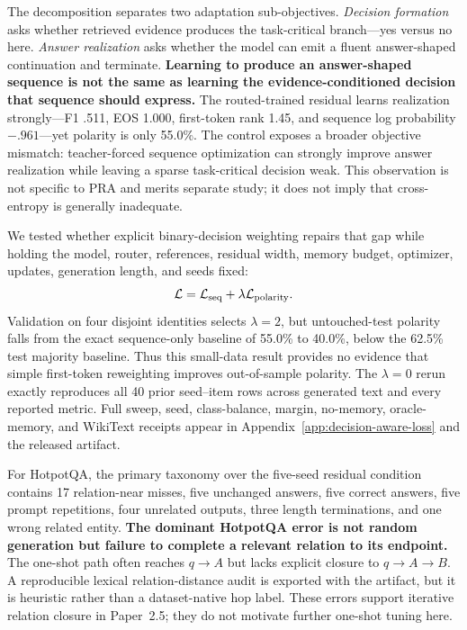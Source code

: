 \documentclass[11pt]{article}
\begin{document}
The decomposition separates two adaptation sub-objectives. \emph{Decision formation} asks whether
retrieved evidence produces the task-critical branch---yes versus no here. \emph{Answer
realization} asks whether the model can emit a fluent answer-shaped continuation and terminate.
\textbf{Learning to produce an answer-shaped sequence is not the same as learning the
evidence-conditioned decision that sequence should express.} The routed-trained residual learns
realization strongly---F1 .511, EOS 1.000, first-token rank 1.45, and sequence log probability
$-.961$---yet polarity is only 55.0\%. The control exposes a broader objective mismatch:
teacher-forced sequence optimization can strongly improve answer realization while leaving a
sparse task-critical decision weak. This observation is not specific to PRA and merits separate
study; it does not imply that cross-entropy is generally inadequate.

We tested whether explicit binary-decision weighting repairs that gap while holding the model,
router, references, residual width, memory budget, optimizer, updates, generation length, and
seeds fixed:
\begin{equation}
  \mathcal{L}=\mathcal{L}_{\rm seq}+\lambda\mathcal{L}_{\rm polarity}.
\end{equation}
Validation on four disjoint identities selects $\lambda=2$, but untouched-test polarity falls from
the exact sequence-only baseline of 55.0\% to 40.0\%, below the 62.5\% test majority baseline.
Thus this small-data result provides no evidence that simple first-token reweighting improves
out-of-sample polarity. The $\lambda=0$ rerun exactly reproduces all 40 prior seed--item rows across
generated text and every reported metric. Full sweep, seed, class-balance, margin, no-memory,
oracle-memory, and WikiText receipts appear in Appendix~\ref{app:decision-aware-loss} and the
released artifact.

For HotpotQA, the primary taxonomy over the five-seed residual condition contains 17 relation-near
misses, five unchanged answers, five correct answers, five prompt repetitions, four unrelated
outputs, three length terminations, and one wrong related entity. \textbf{The dominant HotpotQA
error is not random generation but failure to complete a relevant relation to its endpoint.} The
one-shot path often reaches $q\rightarrow A$ but lacks explicit closure to
$q\rightarrow A\rightarrow B$. A reproducible lexical relation-distance audit is exported with
the artifact, but it is heuristic rather than a dataset-native hop label. These errors support
iterative relation closure in Paper~2.5; they do not motivate further one-shot tuning here.
\end{document}
